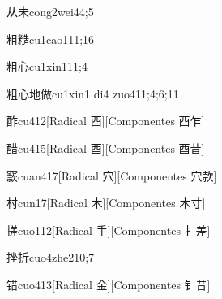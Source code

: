 \begin{verbete}{从未}{cong2wei4}{4;5}
\end{verbete}

\begin{verbete}{粗糙}{cu1cao1}{11;16}
\end{verbete}

\begin{verbete}{粗心}{cu1xin1}{11;4}
\end{verbete}

\begin{verbete}{粗心地做}{cu1xin1 di4 zuo4}{11;4;6;11}
\end{verbete}

\begin{verbete}{酢}{cu4}{12}[Radical 酉][Componentes 酉乍]
\end{verbete}

\begin{verbete}{醋}{cu4}{15}[Radical ⾣][Componentes ⾣昔]
\end{verbete}

\begin{verbete}{窾}{cuan4}{17}[Radical 穴][Componentes 穴款]
\end{verbete}

\begin{verbete}{村}{cun1}{7}[Radical ⽊][Componentes ⽊⼨]
\end{verbete}

\begin{verbete}{搓}{cuo1}{12}[Radical 手][Componentes ⺘差]
\end{verbete}

\begin{verbete}{挫折}{cuo4zhe2}{10;7}
\end{verbete}

\begin{verbete}{错}{cuo4}{13}[Radical 金][Componentes ⻐昔]
\end{verbete}


